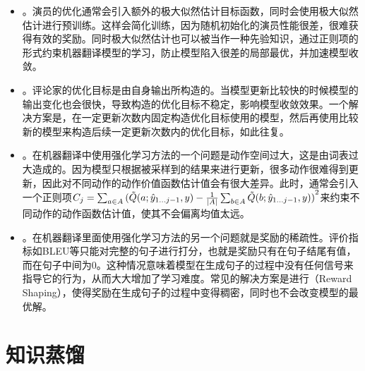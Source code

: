 \begin{itemize}
\vspace{0.5em}
\item {\small{}}。演员的优化通常会引入额外的极大似然估计目标函数，同时会使用极大似然估计进行预训练。这样会简化训练，因为随机初始化的演员性能很差，很难获得有效的奖励。同时极大似然估计也可以被当作一种先验知识，通过正则项的形式约束机器翻译模型的学习，防止模型陷入很差的局部最优，并加速模型收敛。
\vspace{0.5em}
\item {\small{}}。评论家的优化目标是由自身输出所构造的。当模型更新比较快的时候模型的输出变化也会很快，导致构造的优化目标不稳定，影响模型收敛效果。一个解决方案是，在一定更新次数内固定构造优化目标使用的模型，然后再使用比较新的模型来构造后续一定更新次数内的优化目标，如此往复。
\vspace{0.5em}
\item {\small{}}。在机器翻译中使用强化学习方法的一个问题是动作空间过大，这是由词表过大造成的。因为模型只根据被采样到的结果来进行更新，很多动作很难得到更新，因此对不同动作的动作价值函数估计值会有很大差异。此时，通常会引入一个正则项$C_j = \sum_{a \in A}{(\tilde{{Q}}(a;\hat{{y}}_{1 \ldots j-1},{y}) - \frac{1}{|A|} \sum_{b \in A}\tilde{{Q}}(b;\hat{{y}}_{1 \ldots j-1},{y}))}^2$来约束不同动作的动作函数估计值，使其不会偏离均值太远。
\vspace{0.5em}
\item {\small{}}。在机器翻译里面使用强化学习方法的另一个问题就是奖励的稀疏性。评价指标如BLEU等只能对完整的句子进行打分，也就是奖励只有在句子结尾有值，而在句子中间为0。这种情况意味着模型在生成句子的过程中没有任何信号来指导它的行为，从而大大增加了学习难度。常见的解决方案是进行{\small{}}（Reward Shaping），使得奖励在生成句子的过程中变得稠密，同时也不会改变模型的最优解。
\vspace{0.5em}
\end{itemize}


\sectionnewpage
\section{知识蒸馏}\label{subsection-7.5.3}

